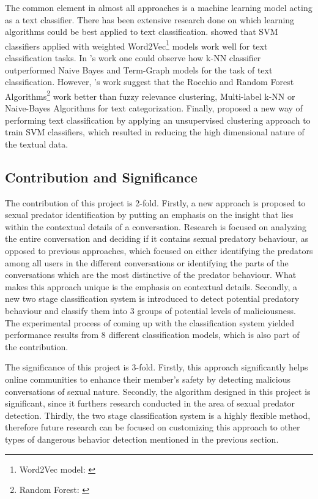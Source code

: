 \documentclass[11pt]{article}
\begin{document}
The common element in almost all approaches is a machine learning model acting as a text classifier. There has been extensive research done on which learning algorithms could be best applied to text classification. \cite{lilleberg2015support} showed that SVM classifiers applied with weighted Word2Vec\footnote{Word2Vec model: \cite{mikolov2013efficient}} models work well for text classification tasks. In \cite{bijalwan2014knn}'s work one could observe how k-NN classifier outperformed Naive Bayes and Term-Graph models for the task of text classification. However, \cite{selvi2017text}'s work suggest that the Rocchio and Random Forest Algorithms\footnote{Random Forest: \cite{breiman2001random}} work better than fuzzy relevance clustering, Multi-label k-NN or Naive-Bayes Algorithms for text categorization. Finally, \cite{shafiabady2016using} proposed a new way of performing text classification by applying an unsupervised clustering approach to train SVM classifiers, which resulted in reducing the high dimensional nature of the textual data.

\subsection{Contribution and Significance}
The contribution of this project is 2-fold. Firstly, a new approach is proposed to sexual predator identification by putting an emphasis on the insight that lies within the contextual details of a conversation. Research is focused on analyzing the entire conversation and deciding if it contains sexual predatory behaviour, as opposed to previous approaches, which focused on either identifying the predators among all users in the different conversations or identifying the parts of the conversations which are the most distinctive of the predator behaviour. What makes this approach unique is the emphasis on contextual details. Secondly, a new two stage classification system is introduced to detect potential predatory behaviour and classify them into 3 groups of potential levels of maliciousness. The experimental process of coming up with the classification system yielded performance results from 8 different classification models, which is also part of the contribution.

The significance of this project is 3-fold. Firstly, this approach significantly helps online communities to enhance their member's safety by detecting malicious conversations of sexual nature. Secondly, the algorithm designed in this project is significant, since it furthers research conducted in the area of sexual predator detection. Thirdly, the two stage classification system is a highly flexible method, therefore future research can be focused on customizing this approach to other types of dangerous behavior detection mentioned in the previous section.
\end{document}
